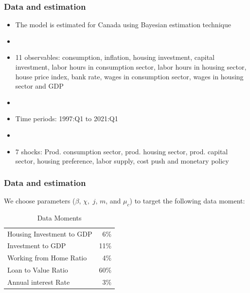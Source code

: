 \documentclass[blue]{beamer}
\begin{document}
\begin{frame}
\frametitle{Data and estimation}
\label{main}      
 \begin{itemize}
 \item The model is estimated for Canada using Bayesian estimation technique
\item []
 \item 11 observables: consumption, inflation, housing investment, capital investment, labor hours in consumption sector, labor hours in housing sector, house price index, bank rate, wages in consumption sector, wages in housing sector and GDP
\item []
 \item Time periods: 1997:Q1 to 2021:Q1
\item []
\item 7 shocks: Prod. consumption sector, prod. housing sector, prod. capital sector, housing preference, labor supply, cost push and monetary policy
 \end{itemize}
 \end{frame}
 
 
 
 
 \begin{frame}
 	\frametitle{Data and estimation}
 	We choose parameters ($\beta$, $\chi,$ $j$, $m$, and $\mu_c$) to target the following data moment:
 	\begin{table}[htbp]
 		\centering
 		\caption{Data Moments}
 		\begin{tabular}{lr} 
 			\hline
 			Housing Investment to GDP & 6\% \\
 			Investment to GDP & 11\% \\
 			Working from Home Ratio & 4\% \\
 			Loan to Value Ratio & 60\% \\
 			Annual interest Rate  & 3\% \\
 			\hline
 		\end{tabular}%
 		\label{tab:addlabel}%
 	\end{table}%
 \end{frame}
 
 
 
 
 
 
 
 
 
 
 
 
 
 
 
\end{document}
